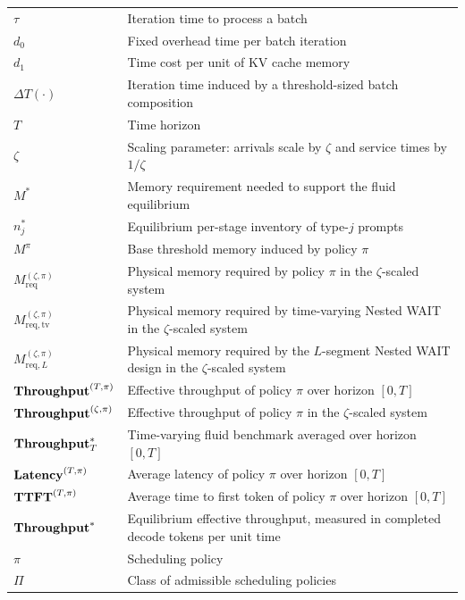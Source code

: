 \begin{center}
\begin{longtable}{>{\raggedright\arraybackslash}p{}p{}}
$\tau$ & Iteration time to process a batch \\
$d_0$ & Fixed overhead time per batch iteration \\
$d_1$ & Time cost per unit of KV cache memory \\
$\Delta T(\cdot)$ & Iteration time induced by a threshold-sized batch composition \\
\midrule
$T$ & Time horizon \\
$\zeta$ & Scaling parameter: arrivals scale by $\zeta$ and service times by $1/\zeta$ \\
$M^*$ & Memory requirement needed to support the fluid equilibrium \\
$n_j^*$ & Equilibrium per-stage inventory of type-$j$ prompts \\
$M^\pi$ & Base threshold memory induced by policy $\pi$ \\
$M_{\mathrm{req}}^{(\zeta,\pi)}$ & Physical memory required by policy $\pi$ in the $\zeta$-scaled system \\
$M_{\mathrm{req},\mathrm{tv}}^{(\zeta,\pi)}$ & Physical memory required by time-varying Nested WAIT in the $\zeta$-scaled system \\
$M_{\mathrm{req},L}^{(\zeta,\pi)}$ & Physical memory required by the $L$-segment Nested WAIT design in the $\zeta$-scaled system \\
$\textbf{Throughput}^{(T,\pi)}$ & Effective throughput of policy $\pi$ over horizon $[0,T]$ \\
$\textbf{Throughput}^{(\zeta,\pi)}$ & Effective throughput of policy $\pi$ in the $\zeta$-scaled system \\
$\textbf{Throughput}_T^*$ & Time-varying fluid benchmark averaged over horizon $[0,T]$ \\
$\textbf{Latency}^{(T,\pi)}$ & Average latency of policy $\pi$ over horizon $[0,T]$ \\
$\textbf{TTFT}^{(T,\pi)}$ & Average time to first token of policy $\pi$ over horizon $[0,T]$ \\
$\textbf{Throughput}^*$ & Equilibrium effective throughput, measured in completed decode tokens per unit time \\
$\pi$ & Scheduling policy \\
$\Pi$ & Class of admissible scheduling policies \\
\end{longtable}
\end{center}

